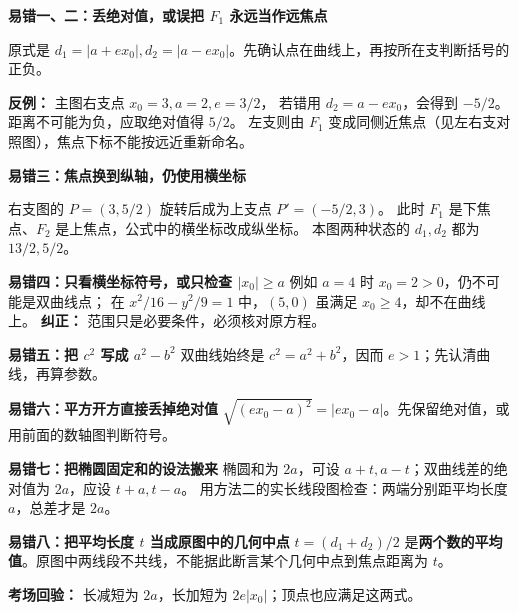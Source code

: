 \clearpage
\begin{trapbox}
\textbf{\textcolor{CTrap}{易错一、二：丢绝对值，或误把 $F_1$ 永远当作远焦点}}

原式是 $d_1=|a+ex_0|,d_2=|a-ex_0|$。先确认点在曲线上，再按所在支判断括号的正负。

\textbf{反例：} 主图右支点 $x_0=3,a=2,e=3/2$，
若错用 $d_2=a-ex_0$，会得到 $-5/2$。距离不可能为负，应取绝对值得 $5/2$。
左支则由 $F_1$ 变成同侧近焦点（见左右支对照图），焦点下标不能按远近重新命名。
\end{trapbox}
\clearpage
\begin{trapbox}
\textbf{\textcolor{CTrap}{易错三：焦点换到纵轴，仍使用横坐标}}

右支图的 $P=(3,5/2)$ 旋转后成为上支点 $P'=(-5/2,3)$。
此时 $F_1$ 是下焦点、$F_2$ 是上焦点，公式中的横坐标改成纵坐标。
本图两种状态的 $d_1,d_2$ 都为 $13/2,5/2$。
\end{trapbox}
\clearpage
\begin{trapbox}
\textbf{\textcolor{CTrap}{易错四：只看横坐标符号，或只检查 $|x_0|\ge a$}}
例如 $a=4$ 时 $x_0=2>0$，仍不可能是双曲线点；
在 $x^2/16-y^2/9=1$ 中，$(5,0)$ 虽满足 $x_0\ge4$，却不在曲线上。
\textbf{纠正：} 范围只是必要条件，必须核对原方程。

\medskip
\textbf{\textcolor{CTrap}{易错五：把 $c^2$ 写成 $a^2-b^2$}}
双曲线始终是 $c^2=a^2+b^2$，因而 $e>1$；先认清曲线，再算参数。

\medskip
\textbf{\textcolor{CTrap}{易错六：平方开方直接丢掉绝对值}}
$\sqrt{(ex_0-a)^2}=|ex_0-a|$。先保留绝对值，或用前面的数轴图判断符号。

\medskip
\textbf{\textcolor{CTrap}{易错七：把椭圆固定和的设法搬来}}
椭圆和为 $2a$，可设 $a+t,a-t$；双曲线差的绝对值为 $2a$，应设 $t+a,t-a$。
用方法二的实长线段图检查：两端分别距平均长度 $a$，总差才是 $2a$。

\medskip
\textbf{\textcolor{CTrap}{易错八：把平均长度 $t$ 当成原图中的几何中点}}
$t=(d_1+d_2)/2$ 是\textbf{两个数的平均值}。原图中两线段不共线，不能据此断言某个几何中点到焦点距离为 $t$。

\medskip
\textbf{考场回验：} 长减短为 $2a$，长加短为 $2e|x_0|$；顶点也应满足这两式。
\end{trapbox}
